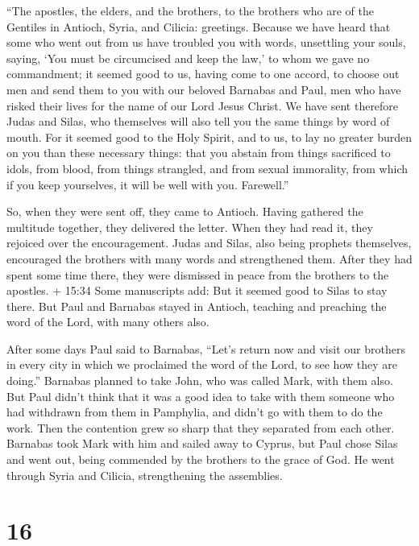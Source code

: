 ``The apostles, the elders, and the brothers, to the brothers who are of
the Gentiles in Antioch, Syria, and Cilicia: greetings. 
Because we have heard that some who went out from us have troubled you
with words, unsettling your souls, saying, `You must be circumcised and
keep the law,' to whom we gave no commandment;  it seemed
good to us, having come to one accord, to choose out men and send them
to you with our beloved Barnabas and Paul,  men who have
risked their lives for the name of our Lord Jesus Christ. 
We have sent therefore Judas and Silas, who themselves will also tell
you the same things by word of mouth.  For it seemed good
to the Holy Spirit, and to us, to lay no greater burden on you than
these necessary things:  that you abstain from things
sacrificed to idols, from blood, from things strangled, and from sexual
immorality, from which if you keep yourselves, it will be well with you.
Farewell.''

 So, when they were sent off, they came to Antioch. Having
gathered the multitude together, they delivered the letter.
 When they had read it, they rejoiced over the
encouragement.  Judas and Silas, also being prophets
themselves, encouraged the brothers with many words and strengthened
them.  After they had spent some time there, they were
dismissed in peace from the brothers to the apostles.  +
15:34 Some manuscripts add: But it seemed good to Silas to stay there.
 But Paul and Barnabas stayed in Antioch, teaching and
preaching the word of the Lord, with many others also.

 After some days Paul said to Barnabas, ``Let's return now
and visit our brothers in every city in which we proclaimed the word of
the Lord, to see how they are doing.''  Barnabas planned to
take John, who was called Mark, with them also.  But Paul
didn't think that it was a good idea to take with them someone who had
withdrawn from them in Pamphylia, and didn't go with them to do the
work.  Then the contention grew so sharp that they
separated from each other. Barnabas took Mark with him and sailed away
to Cyprus,  but Paul chose Silas and went out, being
commended by the brothers to the grace of God.  He went
through Syria and Cilicia, strengthening the assemblies.

\hypertarget{section-15}{%
\section{16}\label{section-15}}

